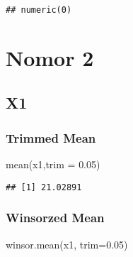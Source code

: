 \documentclass[
]{article}
\newenvironment{Shaded}{\begin{snugshade}}{\end{snugshade}}
\newcommand{\AttributeTok}[1]{\textcolor[rgb]{0.77,0.63,0.00}{#1}}
\newcommand{\ConstantTok}[1]{\textcolor[rgb]{0.00,0.00,0.00}{#1}}
\newcommand{\DecValTok}[1]{\textcolor[rgb]{0.00,0.00,0.81}{#1}}
\newcommand{\FloatTok}[1]{\textcolor[rgb]{0.00,0.00,0.81}{#1}}
\newcommand{\FunctionTok}[1]{\textcolor[rgb]{0.00,0.00,0.00}{#1}}
\newcommand{\NormalTok}[1]{#1}
\newcommand{\OtherTok}[1]{\textcolor[rgb]{0.56,0.35,0.01}{#1}}
\newcommand{\SpecialCharTok}[1]{\textcolor[rgb]{0.00,0.00,0.00}{#1}}
\newcommand{\StringTok}[1]{\textcolor[rgb]{0.31,0.60,0.02}{#1}}
\begin{document}
\begin{Shaded}
\end{Shaded}

\begin{verbatim}
## numeric(0)
\end{verbatim}

\hypertarget{nomor-2}{%
\section{Nomor 2}\label{nomor-2}}

\hypertarget{x1}{%
\subsection{X1}\label{x1}}

\hypertarget{trimmed-mean}{%
\subsubsection{Trimmed Mean}\label{trimmed-mean}}

\begin{Shaded}
\begin{Highlighting}[]
\FunctionTok{mean}\NormalTok{(x1,}\AttributeTok{trim =} \FloatTok{0.05}\NormalTok{)}
\end{Highlighting}
\end{Shaded}

\begin{verbatim}
## [1] 21.02891
\end{verbatim}

\hypertarget{winsorzed-mean}{%
\subsubsection{Winsorzed Mean}\label{winsorzed-mean}}

\begin{Shaded}
\begin{Highlighting}[]
\FunctionTok{winsor.mean}\NormalTok{(x1, }\AttributeTok{trim=}\FloatTok{0.05}\NormalTok{)}
\end{Highlighting}
\end{Shaded}
\end{document}
